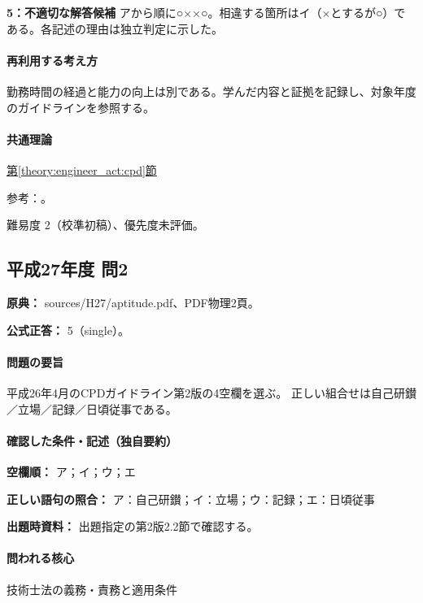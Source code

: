\noindent\textbf{5：不適切な解答候補} アから順に○××○。相違する箇所はイ（×とするが○）である。各記述の理由は独立判定に示した。\par

\paragraph{再利用する考え方} 勤務時間の経過と能力の向上は別である。学んだ内容と証拠を記録し、対象年度のガイドラインを参照する。

\paragraph{共通理論} \hyperref[theory:engineer_act:cpd]{第\ref*{theory:engineer_act:cpd}節}

\par 参考：\cite{cpd_v1}。

\par 難易度 2（校準初稿）、優先度未評価。

\subsection{平成27年度 問2}
\label{q:h27-reg-apt-02}

\noindent\textbf{原典：} sources/H27/aptitude.pdf、PDF物理2頁。

\textbf{公式正答：} 5（single）。

\paragraph{問題の要旨} 平成26年4月のCPDガイドライン第2版の4空欄を選ぶ。 正しい組合せは自己研鑚／立場／記録／日頃従事である。

\paragraph{確認した条件・記述（独自要約）}\mbox{}\par

\noindent\textbf{空欄順：} ア；イ；ウ；エ\par

\noindent\textbf{正しい語句の照合：} ア：自己研鑚；イ：立場；ウ：記録；エ：日頃従事\par

\noindent\textbf{出題時資料：} 出題指定の第2版2.2節で確認する。\par

\paragraph{問われる核心} 技術士法の義務・責務と適用条件

